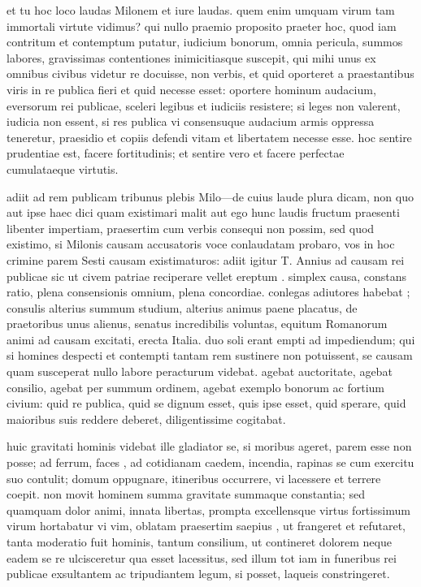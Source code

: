  et tu hoc loco laudas Milonem et iure laudas. quem enim umquam virum tam immortali virtute vidimus? qui nullo praemio proposito praeter hoc, quod iam contritum et contemptum putatur, iudicium bonorum, omnia pericula, summos labores, gravissimas contentiones inimicitiasque suscepit, qui mihi unus ex omnibus civibus videtur re docuisse, non verbis, et quid oporteret a praestantibus viris in re publica fieri et quid necesse esset: oportere hominum audacium, eversorum rei publicae, sceleri legibus et iudiciis resistere; si leges non valerent, iudicia non essent, si res publica vi consensuque audacium armis oppressa teneretur, praesidio et copiis defendi vitam et libertatem necesse esse. hoc sentire prudentiae est, facere fortitudinis; et sentire vero et facere perfectae cumulataeque virtutis.

 adiit ad rem publicam tribunus plebis Milo—de cuius laude plura dicam, non quo aut ipse haec dici quam existimari malit aut ego hunc laudis fructum praesenti libenter impertiam, praesertim cum verbis consequi non possim, sed quod existimo, si Milonis causam accusatoris voce conlaudatam probaro, vos in hoc crimine parem Sesti causam existimaturos: adiit igitur T. Annius ad causam rei publicae sic ut civem patriae reciperare vellet ereptum . simplex causa, constans ratio, plena consensionis omnium, plena concordiae. conlegas adiutores habebat ; consulis alterius summum studium, alterius animus paene placatus, de praetoribus unus alienus, senatus incredibilis voluntas, equitum Romanorum animi ad causam excitati, erecta Italia. duo soli erant empti ad impediendum; qui si homines despecti et contempti tantam rem sustinere non potuissent, se causam quam susceperat nullo labore peracturum videbat. agebat auctoritate, agebat consilio, agebat per summum ordinem, agebat exemplo bonorum ac fortium civium: quid re publica, quid se dignum esset, quis ipse esset, quid sperare, quid maioribus suis reddere deberet, diligentissime cogitabat.

 huic gravitati hominis videbat ille gladiator se, si moribus ageret, parem esse non posse; ad ferrum, faces , ad cotidianam caedem, incendia, rapinas se cum exercitu suo contulit; domum oppugnare, itineribus occurrere, vi lacessere et terrere coepit. non movit hominem summa gravitate summaque constantia; sed quamquam dolor animi, innata libertas, prompta excellensque virtus fortissimum virum hortabatur vi vim, oblatam praesertim saepius , ut frangeret et refutaret, tanta moderatio fuit hominis, tantum consilium, ut contineret dolorem neque eadem se re ulcisceretur qua esset lacessitus, sed illum tot iam in funeribus rei publicae exsultantem ac tripudiantem legum, si posset, laqueis constringeret.

